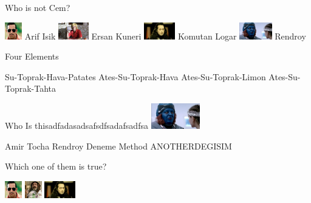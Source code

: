 \documentclass{exam}
\begin{document}
\begin{questions}
\question Who is not Cem?\newline
\begin{oneparchoices}
\choice \includegraphics[height=2em]{arifisik.jpg}
Arif Isik
\choice \includegraphics[height=2em]{ersan.jpg}
Ersan Kuneri
\choice \includegraphics[height=2em]{komutanlogar.jpeg}
Komutan Logar
\choice \includegraphics[height=2em]{rendroy2.jpg}
Rendroy
\end{oneparchoices}
\question Four Elements\newline
\begin{oneparchoices}
\choice Su-Toprak-Hava-Patates
\choice Ates-Su-Toprak-Hava
\choice Ates-Su-Toprak-Limon
\choice Ates-Su-Toprak-Tahta
\end{oneparchoices}
\question Who Is thisadfadasadsafsdfsadafsadfsa\newline
\includegraphics[height=3em]{rendroy2.jpg} \newline
\begin{oneparchoices}
\choice Amir Tocha
\choice Rendroy
\choice Deneme Method
\choice ANOTHERDEGISIM
\end{oneparchoices}
\question Which one of them is true?\newline
\begin{oneparchoices}
\choice \includegraphics[height=2em]{arifisik.jpg}
\choice \includegraphics[height=2em]{faruk.jpg}
\choice \includegraphics[height=2em]{komutanlogar.jpeg}

\end{oneparchoices}
\end{questions}
\end{document}

